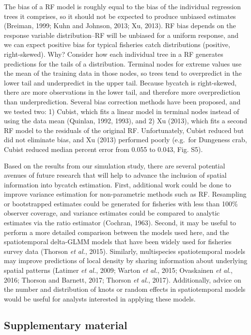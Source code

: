\documentclass[]{article}
\begin{document}
The bias of a RF model is roughly equal to the bias of the individual
regression trees it comprises, so it should not be expected to produce
unbiased estimates (Breiman, 1999; Kuhn and Johnson, 2013; Xu, 2013). RF
bias depends on the response variable distribution--RF will be unbiased
for a uniform response, and we can expect positive bias for typical
fisheries catch distributions (positive, right-skewed). Why? Consider
how each individual tree in a RF generates predictions for the tails of
a distribution. Terminal nodes for extreme values use the mean of the
training data in those nodes, so trees tend to overpredict in the lower
tail and underpredict in the upper tail. Because bycatch is
right-skewed, there are more observations in the lower tail, and
therefore more overprediction than underprediction. Several bias
correction methods have been proposed, and we tested two: 1) Cubist,
which fits a linear model in terminal nodes instead of using the data
mean (Quinlan, 1992, 1993), and 2) Xu (2013), which fits a second RF
model to the residuals of the original RF. Unfortunately, Cubist reduced
but did not eliminate bias, and Xu (2013) performed poorly (e.g.~for
Dungeness crab, Cubist reduced median percent error from 0.055 to 0.043,
Fig. S5).

Based on the results from our simulation study, there are several
potential avenues of future research that will help to advance the
inclusion of spatial information into bycatch estimation. First,
additional work could be done to improve variance estimation for
non-parametric methods such as RF. Resampling or bootstrapped estimates
could be generated for fisheries with less than 100\% observer coverage,
and variance estimates could be compared to analytic estimates via the
ratio estimator (Cochran, 1963). Second, it may be useful to perform a
more detailed comparison between the models used here, and the
spatiotemporal delta-GLMM models that have been widely used for
fisheries survey data (Thorson \emph{et al.}, 2015). Similarly,
multispecies spatiotemporal models may improve predictions of local
density by sharing information about underlying spatial patterns
(Latimer \emph{et al.}, 2009; Warton \emph{et al.}, 2015; Ovaskainen
\emph{et al.}, 2016; Thorson and Barnett, 2017; Thorson \emph{et al.},
2017). Additionally, advice on the number and distribution of knots or
random effects in spatiotemporal models would be useful for analysts
interested in applying these models.

\subsection{Supplementary material}\label{supplementary-material}
\end{document}
